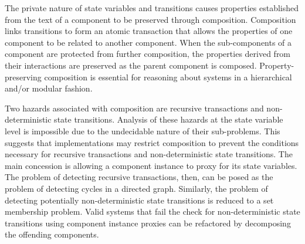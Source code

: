 The private nature of state variables and transitions causes properties established from the text of a component to be preserved through composition.
Composition links transitions to form an atomic transaction that allows the properties of one component to be related to another component.
When the sub-components of a component are protected from further composition, the properties derived from their interactions are preserved as the parent component is composed.
Property-preserving composition is essential for reasoning about systems in a hierarchical and/or modular fashion.

Two hazards associated with composition are recursive transactions and non-deterministic state transitions.
Analysis of these hazards at the state variable level is impossible due to the undecidable nature of their sub-problems.
This suggests that implementations may restrict composition to prevent the conditions necessary for recursive transactions and non-deterministic state transitions.
The main concession is allowing a component instance to proxy for its state variables.
The problem of detecting recursive transactions, then, can be posed as the problem of detecting cycles in a directed graph.
Similarly, the problem of detecting potentially non-deterministic state transitions is reduced to a set membership problem.
Valid systems that fail the check for non-deterministic state transitions using component instance proxies can be refactored by decomposing  the offending components.
